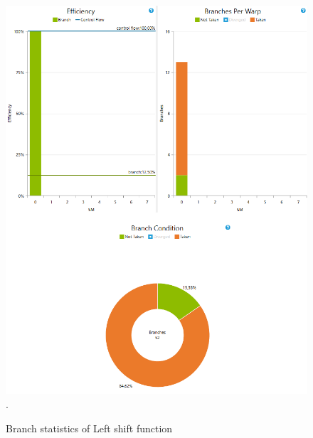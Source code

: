 \documentclass[oneside,openright,12pt,final,en]{mgr}
\begin{document}
\begin{figure}[H]
	\centering
	\includegraphics[width=\textwidth]{leftshift_branch}.
	\caption{Branch statistics of Left shift function}
	\label{fig:leftshift_branch}
\end{figure}
\end{document}
